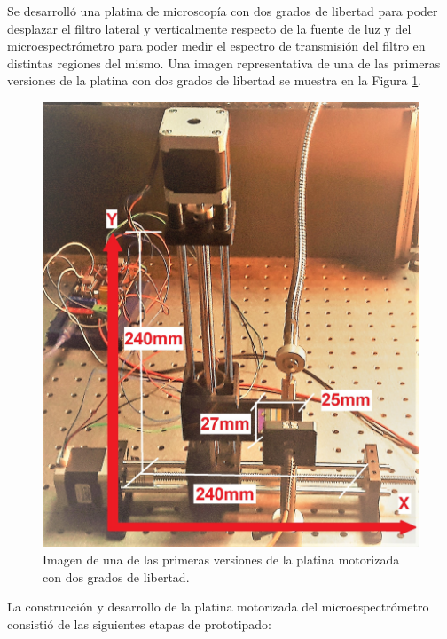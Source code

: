 \hspace{0.5cm}Se desarrolló una platina de microscopía con dos grados de libertad para poder desplazar el filtro lateral y verticalmente respecto de la fuente de luz y del microespectrómetro para poder medir el espectro de transmisión del filtro en distintas regiones del mismo. Una imagen representativa de una de las primeras versiones de la platina con dos grados de libertad se muestra en la Figura \ref{fig:plato0}.


\begin{figure}[H]
	\centering
	\includegraphics[scale=0.15]{Figs/microespectrometro/stageearly.jpg}
	\caption{Imagen de una de las primeras versiones de la platina motorizada con dos grados de libertad.}
	\label{fig:plato0}
\end{figure}


La construcción y desarrollo de la platina motorizada del microespectrómetro consistió de las siguientes etapas de prototipado:

